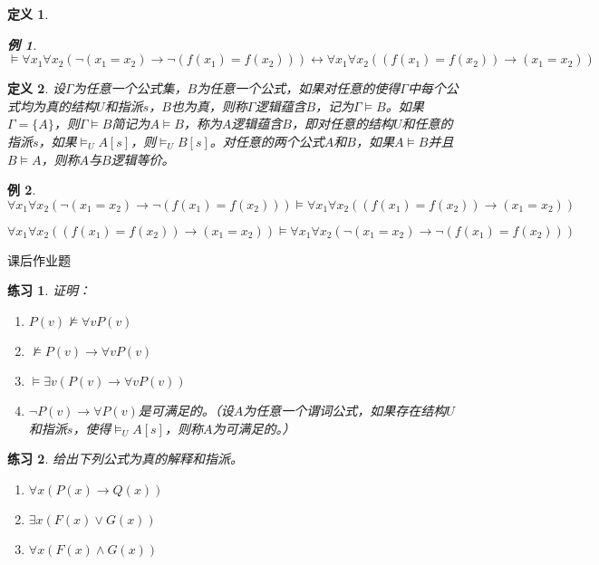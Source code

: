 \documentclass{article}
\newtheorem{Def}{定义}
\newtheorem{Exercise}{练习}
\newtheorem*{Example}{例}
\begin{document}
\begin{CJK*}{UTF8}{gbsn}
\begin{Def}
  \begin{Example}
    $\vDash \forall x_1 \forall x_2(\lnot(x_1=x_2)\to \lnot (f(x_1)=f(x_2)))\leftrightarrow \forall x_1\forall x_2 ((f(x_1)=f(x_2))\to (x_1=x_2))$
  \end{Example}
\end{Def}
\begin{Def}
  设$\Gamma$为任意一个公式集，$B$为任意一个公式，如果对任意的使得$\Gamma$中每个公式均为真的结构$U$和指派$s$，$B$也为真，则称$\Gamma$逻辑蕴含$B$，记为$\Gamma \vDash B$。如果$\Gamma=\{A\}$，则$\Gamma \vDash B$简记为$A\vDash B$，称为$A$逻辑蕴含$B$，即对任意的结构$U$和任意的指派$s$，如果$\vDash_UA[s]$，则$\vDash_UB[s]$。对任意的两个公式$A$和$B$，如果$A\vDash B$并且$B\vDash A$，则称$A$与$B$逻辑等价。
\end{Def}
\begin{Example}
  $\forall x_1 \forall x_2(\lnot(x_1=x_2)\to \lnot (f(x_1)=f(x_2)))\vDash \forall x_1\forall x_2 ((f(x_1)=f(x_2))\to (x_1=x_2))$

  $\forall x_1\forall x_2 ((f(x_1)=f(x_2))\to (x_1=x_2))\vDash \forall x_1 \forall x_2(\lnot(x_1=x_2)\to \lnot (f(x_1)=f(x_2)))$
\end{Example}
课后作业题
\begin{Exercise}证明：
  \begin{enumerate}
    \item $P(v)\nvDash \forall v P(v)$
    \item $\nvDash P(v)\to \forall vP(v)$
    \item $\vDash \exists v(P(v)\to \forall v P(v))$
    \item $\lnot P(v)\to \forall P(v)$是可满足的。（设$A$为任意一个谓词公式，如果存在结构$U$和指派$s$，使得$\vDash_UA[s]$，则称$A$为可满足的。）
  \end{enumerate}
\end{Exercise}

\begin{Exercise}
  给出下列公式为真的解释和指派。

  \begin{enumerate}
    \item $\forall x(P(x)\to Q(x))$
    \item $\exists x(F(x)\lor G(x))$
    \item $\forall x(F(x)\land G(x))$
  \end{enumerate}
\end{Exercise}
\end{CJK*}
\end{document}
